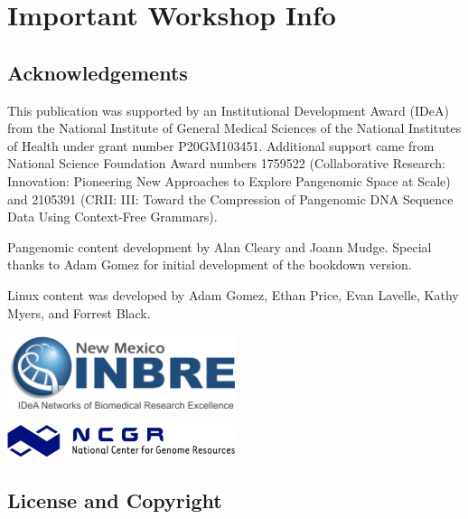 \documentclass[
]{book}
\begin{document}
\hypertarget{important-workshop-info}{%
\chapter*{Important Workshop Info}\label{important-workshop-info}}

\hypertarget{acknowledgements}{%
\section*{Acknowledgements}\label{acknowledgements}}

This publication was supported by an Institutional Development Award (IDeA) from the National Institute of General Medical Sciences of the National Institutes of Health under grant number P20GM103451. Additional support came from National Science Foundation Award numbers 1759522 (Collaborative Research: Innovation: Pioneering New Approaches to Explore Pangenomic Space at Scale) and 2105391 (CRII: III: Toward the Compression of Pangenomic DNA Sequence Data Using Context-Free Grammars).

Pangenomic content development by Alan Cleary and Joann Mudge. Special thanks to Adam Gomez for initial development of the bookdown version.

Linux content was developed by Adam Gomez, Ethan Price, Evan Lavelle, Kathy Myers, and Forrest Black.

\includegraphics[width=0.5\textwidth,height=\textheight]{./Figures/INBRE_Logo_Grad_transparent-2019.png}

\includegraphics[width=0.5\textwidth,height=\textheight]{./Figures/ncgr.png}

\hypertarget{license-and-copyright-1}{%
\section*{License and Copyright}\label{license-and-copyright-1}}
\end{document}
